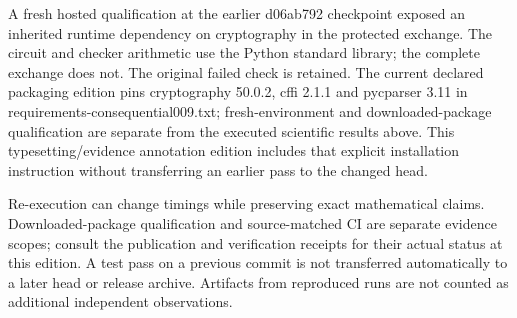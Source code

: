 \documentclass[10pt,letterpaper]{article}
\begin{document}
A fresh hosted qualification at the earlier d06ab792 checkpoint exposed an inherited runtime dependency on cryptography in the protected exchange. The circuit and checker arithmetic use the Python standard library; the complete exchange does not. The original failed check is retained. The current declared packaging edition pins cryptography 50.0.2, cffi 2.1.1 and pycparser 3.11 in requirements-consequential009.txt; fresh-environment and downloaded-package qualification are separate from the executed scientific results above. This typesetting/evidence annotation edition includes that explicit installation instruction without transferring an earlier pass to the changed head.\par
Re-execution can change timings while preserving exact mathematical claims. Downloaded-package qualification and source-matched CI are separate evidence scopes; consult the publication and verification receipts for their actual status at this edition. A test pass on a previous commit is not transferred automatically to a later head or release archive. Artifacts from reproduced runs are not counted as additional independent observations.\par
\end{document}
